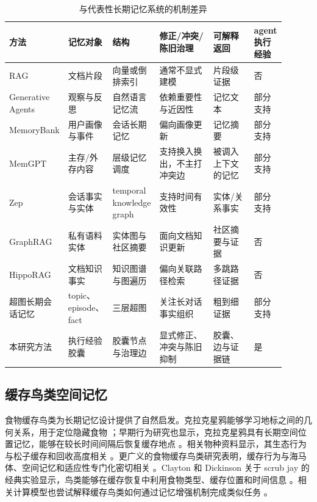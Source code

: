 \documentclass[a4paper,fleqn]{cas-sc}
\begin{document}
\begin{CJK*}{UTF8}{gbsn}
\begin{table}[t]
\centering
\scriptsize
\caption{与代表性长期记忆系统的机制差异}
\label{tab:related-work-diff}
\setlength{\tabcolsep}{2pt}
\begin{tabular}{P{0.13\linewidth}P{0.16\linewidth}P{0.17\linewidth}P{0.20\linewidth}P{0.15\linewidth}P{0.09\linewidth}}
\toprule
方法 & 记忆对象 & 结构 & 修正/冲突/陈旧治理 & 可解释返回 & agent 执行经验 \\
\midrule
RAG & 文档片段 & 向量或倒排索引 & 通常不显式建模 & 片段级证据 & 否 \\
Generative Agents & 观察与反思 & 自然语言记忆流 & 依赖重要性与近因性 & 记忆文本 & 部分支持 \\
MemoryBank & 用户画像与事件 & 会话长期记忆 & 偏向画像更新 & 记忆摘要 & 部分支持 \\
MemGPT & 主存/外存内容 & 层级记忆调度 & 支持换入换出，不主打冲突边 & 被调入上下文的记忆 & 部分支持 \\
Zep & 会话事实与实体 & temporal knowledge graph & 支持时间有效性 & 实体/关系事实 & 部分支持 \\
GraphRAG & 私有语料实体 & 实体图与社区摘要 & 面向文档知识更新 & 社区摘要与证据 & 否 \\
HippoRAG & 文档知识事实 & 知识图谱与图遍历 & 偏向关联路径检索 & 多跳路径证据 & 否 \\
超图长期会话记忆 & topic、episode、fact & 三层超图 & 关注长对话事实组织 & 粗到细证据 & 部分支持 \\
本研究方法 & 执行经验胶囊 & 胶囊节点与治理边 & 显式修正、冲突与陈旧抑制 & 胶囊、边与证据链 & 是 \\
\bottomrule
\end{tabular}
\end{table}

\subsection{缓存鸟类空间记忆}

食物缓存鸟类为长期记忆设计提供了自然启发。克拉克星鸦能够学习地标之间的几何关系，用于定位隐藏食物 \citep{kamil1997nutcracker}；早期行为研究也显示，克拉克星鸦具有长期空间位置记忆，能够在较长时间间隔后恢复缓存地点 \citep{balda1992spatial}。相关物种资料显示，其生态行为与松子缓存和回收高度相关 \citep{cornellClarksNutcracker,nps2018clarksnutcracker}。更广义的食物缓存鸟类研究表明，缓存行为与海马体、空间记忆和适应性专门化密切相关 \citep{sherry1989hippocampal,sherry1987multiple}。Clayton 和 Dickinson 关于 scrub jay 的经典实验显示，鸟类能够在缓存恢复中利用食物类型、缓存位置和时间信息 \citep{clayton1998episodic}。相关计算模型也尝试解释缓存鸟类如何通过记忆增强机制完成类似任务 \citep{brea2023computational}。


\end{CJK*}
\end{document}
